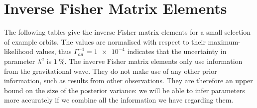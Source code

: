 \appendix

\renewcommand{\chaptername}{Appendix}

\chapter{Inverse Fisher Matrix Elements}

The following tables give the inverse Fisher matrix elements for a small selection of example orbits. The values are normalised with respect to their maximum-likelihood values, thus $\Gamma^{-1}_{aa} = \num{1e-4}$ indicates that the uncertainty in parameter $\lambda^a$ is $\SI{1}{\percent}$. The inverve Fisher matrix elements only use information from the gravitational wave. They do not make use of any other prior information, such as results from other observations. They are therefore an upper bound on the size of the posterior variance: we will be able to infer parameters more accurately if we combine all the information we have regarding them.

